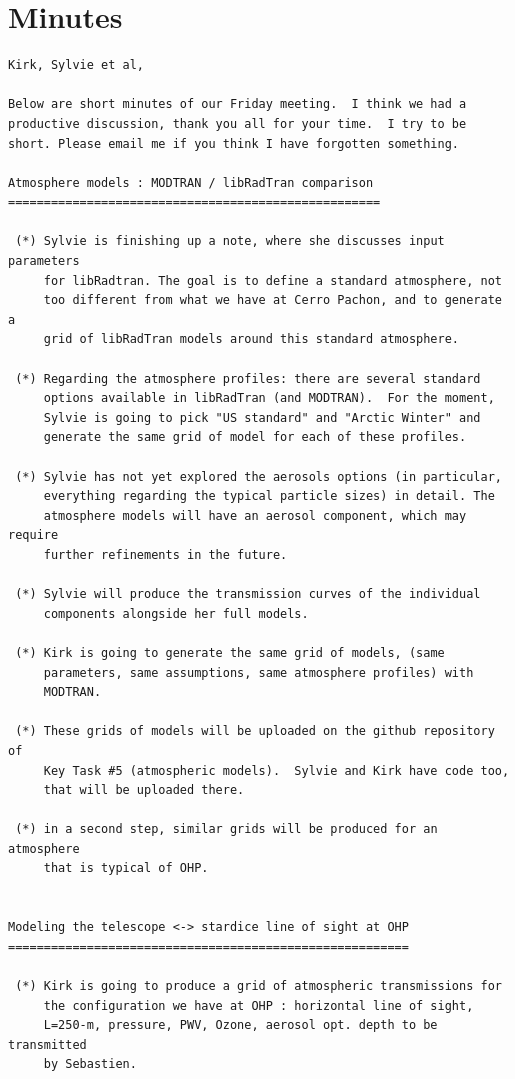 \documentclass[a4paper]{article}
\begin{document}
\newpage

\appendix

\section{Minutes}

\begin{verbatim}
Kirk, Sylvie et al, 

Below are short minutes of our Friday meeting.  I think we had a
productive discussion, thank you all for your time.  I try to be
short. Please email me if you think I have forgotten something.

Atmosphere models : MODTRAN / libRadTran comparison
====================================================

 (*) Sylvie is finishing up a note, where she discusses input parameters
     for libRadtran. The goal is to define a standard atmosphere, not
     too different from what we have at Cerro Pachon, and to generate a
     grid of libRadTran models around this standard atmosphere. 

 (*) Regarding the atmosphere profiles: there are several standard
     options available in libRadTran (and MODTRAN).  For the moment,
     Sylvie is going to pick "US standard" and "Arctic Winter" and
     generate the same grid of model for each of these profiles.

 (*) Sylvie has not yet explored the aerosols options (in particular,
     everything regarding the typical particle sizes) in detail. The
     atmosphere models will have an aerosol component, which may require
     further refinements in the future.

 (*) Sylvie will produce the transmission curves of the individual
     components alongside her full models. 

 (*) Kirk is going to generate the same grid of models, (same
     parameters, same assumptions, same atmosphere profiles) with
     MODTRAN.

 (*) These grids of models will be uploaded on the github repository of
     Key Task #5 (atmospheric models).  Sylvie and Kirk have code too,
     that will be uploaded there.

 (*) in a second step, similar grids will be produced for an atmosphere
     that is typical of OHP.


Modeling the telescope <-> stardice line of sight at OHP
========================================================

 (*) Kirk is going to produce a grid of atmospheric transmissions for
     the configuration we have at OHP : horizontal line of sight,
     L=250-m, pressure, PWV, Ozone, aerosol opt. depth to be transmitted
     by Sebastien.



\end{verbatim}
\end{document}
